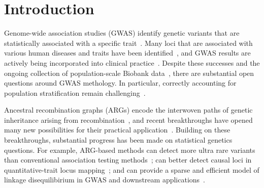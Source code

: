 \documentclass[unnumsec,webpdf,modern,large,namedate]{oup-authoring-template}%
\begin{document}

\maketitle

\section{Introduction}

Genome-wide association studies (GWAS)
identify genetic variants that are statistically
associated with a specific trait~\citep{uffelmann2021}.
Many loci that are associated with various human diseases and
traits have been identified~\citep{locke2015,ishigaki2022,
mahajan2022,yengo2022,mathieson2023},
and GWAS results are actively being incorporated into clinical
practice~\citep{visscher2017}.
Despite these successes and the ongoing collection of population-scale
Biobank data~\citep{tanjo2021practical}, there are substantial open
questions around GWAS methology.
In particular, correctly accounting for population stratification
remain challenging~\citep{uffelmann2021}.

Ancestral recombination graphs (ARGs) encode the interwoven paths
of genetic inheritance arising from recombination~\citep{wong2023general}, and recent
breakthroughs have opened many new possibilities for their
practical application~\citep{lewanski2023era}.
Building on these breakthroughs, substantial progress has been made
on statistical genetics questions.
For example,  ARG-based methods
can detect more ultra rare variants than conventional association testing
methods~\citep{zhang2023};
can better detect causal loci in quantitative-trait locus mapping~\citep{link2023tree};
and can provide a sparse and efficient model of linkage disequilibirium
in GWAS and downstream applications~\citep{nowbandegani2023extremely}.
\end{document}
